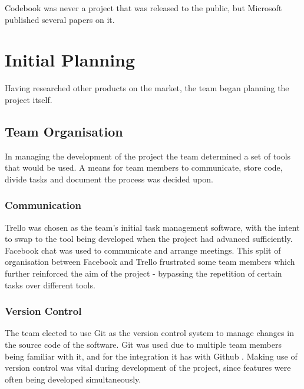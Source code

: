 \documentclass[a4paper]{l3proj}
\begin{document}
Codebook was never a project that was released to the public, but Microsoft published several papers on it.

\chapter{Initial Planning}
\label{initialPlanning}
Having researched other products on the market, the team began planning the project itself. 

\section{Team Organisation}
\label{organisation}

In managing the development of the project the team determined a set of tools that would be used.  A means for team members to communicate, store code, divide tasks and document the process was decided upon.

\subsection{Communication}
\label{communication}
Trello \cite{site:ourTrello} was chosen as the team's initial task management software, with the intent to swap to the tool being developed when the project had advanced sufficiently. Facebook chat was used to communicate and arrange meetings.  This split of organisation between Facebook and Trello frustrated some team members which further reinforced the aim of the project - bypassing the repetition of certain tasks over different tools.

\subsection{Version Control}
\label{version}

The team elected to use Git \cite{site:github} as the version control system to manage changes in the source code of the software. Git was used due to multiple team members being familiar with it, and for the integration it has with Github \cite{site:ourGithub}. Making use of version control was vital during development of the project, since features were often being developed simultaneously.
\end{document}
